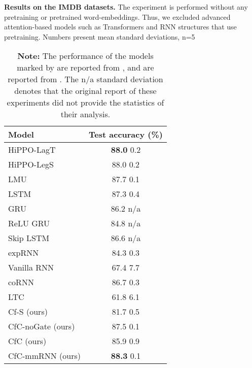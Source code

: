 \documentclass[12pt]{article}
\begin{document}
\begin{table}[t]
    \centering
    \caption{\textbf{Results on the IMDB datasets.} The experiment is performed without any pretraining or pretrained word-embeddings. Thus, we excluded advanced attention-based models \cite{shukla2021multi,ad-trans2021} such as Transformers \cite{vaswani2017attention} and RNN structures that use pretraining. Numbers present mean  standard deviations, n=5}
    \begin{tabular}{lc}
    \toprule
         Model & Test accuracy (\%)  \\
    \midrule
          HiPPO-LagT \cite{gu2020hippo}  & \textbf{88.0}  0.2\\
           HiPPO-LegS \cite{gu2020hippo} & 88.0  0.2\\
           LMU \cite{voelker2019legendre} & 87.7  0.1\\
           LSTM \cite{hochreiter1997long}& 87.3  0.4\\
           GRU \cite{chung2014empirical} & 86.2  n/a \\
          ReLU GRU \cite{dey2017gate} &  84.8  n/a \\
          Skip LSTM \cite{campos2017skip} &  86.6  n/a \\
           expRNN \cite{lezcano2019cheap} & 84.3  0.3 \\
           Vanilla RNN \cite{campos2017skip} & 67.4  7.7\\
          coRNN \cite{rusch2021coupled} & 86.7  0.3 \\
          LTC \cite{hasani2021liquid} & 61.8  6.1 \\
    \midrule
        Cf-S (ours) & 81.7  0.5\\
        CfC-noGate (ours) &  87.5  0.1\\
        CfC (ours) & 85.9  0.9\\
        CfC-mmRNN (ours) & \textbf{88.3}  0.1\\
    \bottomrule
    \end{tabular}
    \caption*{\textbf{Note:} The performance of the models marked by  are reported from \cite{gu2020hippo}, and  are reported from \cite{rusch2021coupled}. The n/a standard deviation denotes that the original report of these experiments did not provide the statistics of their analysis.}
    \label{tab:imdb}
\end{table}
\end{document}
